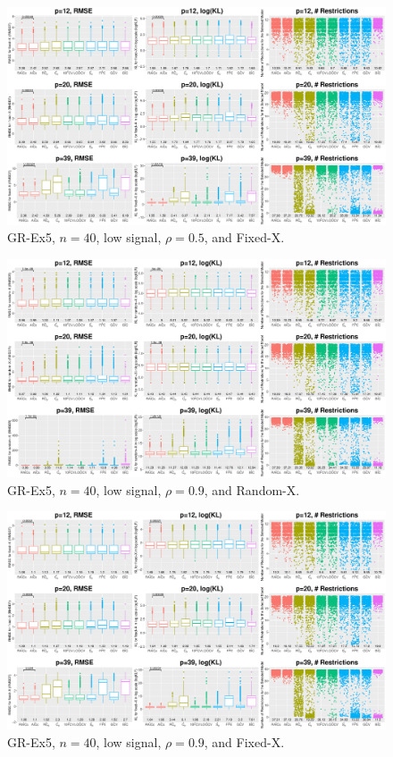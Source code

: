 \begin{figure}[!ht]
\centering
\includegraphics[width=\textwidth]{figures/supplement/fixedx_GR-Ex5_n40_lsnr_rho05.eps}
\caption{GR-Ex5, $n=40$, low signal, $\rho=0.5$, and Fixed-X.}
\end{figure}
\clearpage
\begin{figure}[!ht]
\centering
\includegraphics[width=\textwidth]{figures/supplement/randomx_GR-Ex5_n40_lsnr_rho09.eps}
\caption{GR-Ex5, $n=40$, low signal, $\rho=0.9$, and Random-X.}
\end{figure}
\begin{figure}[!ht]
\centering
\includegraphics[width=\textwidth]{figures/supplement/fixedx_GR-Ex5_n40_lsnr_rho09.eps}
\caption{GR-Ex5, $n=40$, low signal, $\rho=0.9$, and Fixed-X.}
\end{figure}
